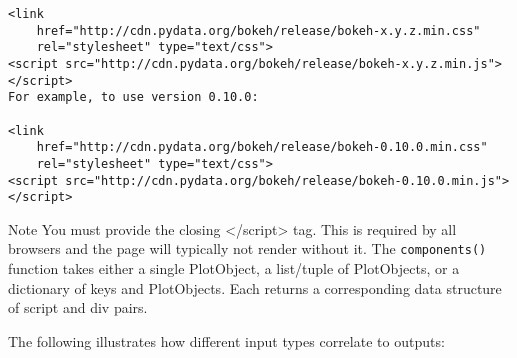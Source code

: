 \begin{framed}
	\begin{verbatim}
<link
    href="http://cdn.pydata.org/bokeh/release/bokeh-x.y.z.min.css"
    rel="stylesheet" type="text/css">
<script src="http://cdn.pydata.org/bokeh/release/bokeh-x.y.z.min.js"></script>
For example, to use version 0.10.0:

<link
    href="http://cdn.pydata.org/bokeh/release/bokeh-0.10.0.min.css"
    rel="stylesheet" type="text/css">
<script src="http://cdn.pydata.org/bokeh/release/bokeh-0.10.0.min.js"></script>
\end{verbatim}
\end{framed}
Note
You must provide the closing </script> tag. This is required by all browsers and the page will typically not render without it.
The \texttt{components()} function takes either a single PlotObject, a list/tuple of PlotObjects, or a dictionary of keys and PlotObjects. Each returns a corresponding data structure of script and div pairs.

The following illustrates how different input types correlate to outputs:

